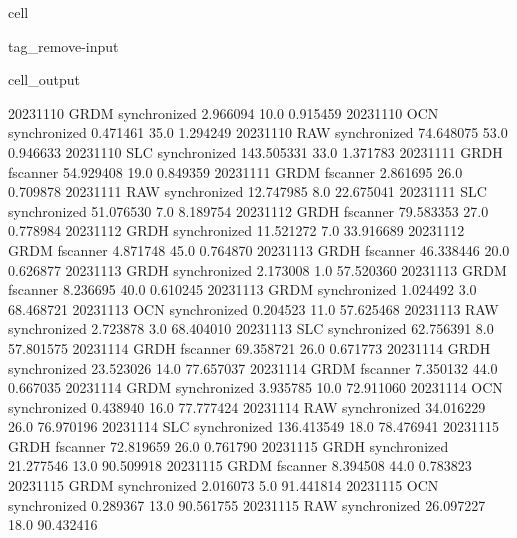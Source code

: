 \documentclass[letterpaper,10pt,english]{jupyterBook}
\begin{document}
\begin{sphinxuseclass}{cell}
\begin{sphinxuseclass}{tag_remove-input}
\begin{sphinxVerbatimOutput}
\begin{sphinxuseclass}{cell_output}
\begin{sphinxVerbatim}[commandchars=\\\{\}]
2023\PYGZhy{}11\PYGZhy{}10         GRDM  synchronized    2.966094    10.0    0.915459
2023\PYGZhy{}11\PYGZhy{}10          OCN  synchronized    0.471461    35.0    1.294249
2023\PYGZhy{}11\PYGZhy{}10          RAW  synchronized   74.648075    53.0    0.946633
2023\PYGZhy{}11\PYGZhy{}10          SLC  synchronized  143.505331    33.0    1.371783
2023\PYGZhy{}11\PYGZhy{}11         GRDH      fscanner   54.929408    19.0    0.849359
2023\PYGZhy{}11\PYGZhy{}11         GRDM      fscanner    2.861695    26.0    0.709878
2023\PYGZhy{}11\PYGZhy{}11          RAW  synchronized   12.747985     8.0   22.675041
2023\PYGZhy{}11\PYGZhy{}11          SLC  synchronized   51.076530     7.0    8.189754
2023\PYGZhy{}11\PYGZhy{}12         GRDH      fscanner   79.583353    27.0    0.778984
2023\PYGZhy{}11\PYGZhy{}12         GRDH  synchronized   11.521272     7.0   33.916689
2023\PYGZhy{}11\PYGZhy{}12         GRDM      fscanner    4.871748    45.0    0.764870
2023\PYGZhy{}11\PYGZhy{}13         GRDH      fscanner   46.338446    20.0    0.626877
2023\PYGZhy{}11\PYGZhy{}13         GRDH  synchronized    2.173008     1.0   57.520360
2023\PYGZhy{}11\PYGZhy{}13         GRDM      fscanner    8.236695    40.0    0.610245
2023\PYGZhy{}11\PYGZhy{}13         GRDM  synchronized    1.024492     3.0   68.468721
2023\PYGZhy{}11\PYGZhy{}13          OCN  synchronized    0.204523    11.0   57.625468
2023\PYGZhy{}11\PYGZhy{}13          RAW  synchronized    2.723878     3.0   68.404010
2023\PYGZhy{}11\PYGZhy{}13          SLC  synchronized   62.756391     8.0   57.801575
2023\PYGZhy{}11\PYGZhy{}14         GRDH      fscanner   69.358721    26.0    0.671773
2023\PYGZhy{}11\PYGZhy{}14         GRDH  synchronized   23.523026    14.0   77.657037
2023\PYGZhy{}11\PYGZhy{}14         GRDM      fscanner    7.350132    44.0    0.667035
2023\PYGZhy{}11\PYGZhy{}14         GRDM  synchronized    3.935785    10.0   72.911060
2023\PYGZhy{}11\PYGZhy{}14          OCN  synchronized    0.438940    16.0   77.777424
2023\PYGZhy{}11\PYGZhy{}14          RAW  synchronized   34.016229    26.0   76.970196
2023\PYGZhy{}11\PYGZhy{}14          SLC  synchronized  136.413549    18.0   78.476941
2023\PYGZhy{}11\PYGZhy{}15         GRDH      fscanner   72.819659    26.0    0.761790
2023\PYGZhy{}11\PYGZhy{}15         GRDH  synchronized   21.277546    13.0   90.509918
2023\PYGZhy{}11\PYGZhy{}15         GRDM      fscanner    8.394508    44.0    0.783823
2023\PYGZhy{}11\PYGZhy{}15         GRDM  synchronized    2.016073     5.0   91.441814
2023\PYGZhy{}11\PYGZhy{}15          OCN  synchronized    0.289367    13.0   90.561755
2023\PYGZhy{}11\PYGZhy{}15          RAW  synchronized   26.097227    18.0   90.432416

\end{sphinxVerbatim}
\end{sphinxuseclass}
\end{sphinxVerbatimOutput}
\end{sphinxuseclass}
\end{sphinxuseclass}
\end{document}
